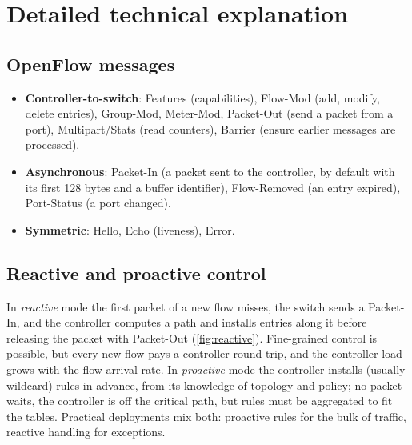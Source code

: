 \documentclass[11pt,a4paper]{article}
\begin{document}
\begin{acnfigure}
  \caption{OpenFlow pipeline with multiple flow tables, and the fields of a flow entry.}
  \label{fig:table}
\end{acnfigure}

\section{Detailed technical explanation}

\subsection{OpenFlow messages}
\begin{itemize}
  \item \textbf{Controller-to-switch}: Features (capabilities), Flow-Mod (add, modify, delete entries),
        Group-Mod, Meter-Mod, Packet-Out (send a packet from a port), Multipart/Stats (read counters), Barrier
        (ensure earlier messages are processed).
  \item \textbf{Asynchronous}: Packet-In (a packet sent to the controller, by default with its first 128 bytes
        and a buffer identifier), Flow-Removed (an entry expired), Port-Status (a port changed).
  \item \textbf{Symmetric}: Hello, Echo (liveness), Error.
\end{itemize}

\subsection{Reactive and proactive control}
In \emph{reactive} mode the first packet of a new flow misses, the switch sends a Packet-In, and the
controller computes a path and installs entries along it before releasing the packet with Packet-Out
(\cref{fig:reactive}). Fine-grained control is possible, but every new flow pays a controller round trip,
and the controller load grows with the flow arrival rate. In \emph{proactive} mode the controller installs
(usually wildcard) rules in advance, from its knowledge of topology and policy; no packet waits, the
controller is off the critical path, but rules must be aggregated to fit the tables. Practical deployments
mix both: proactive rules for the bulk of traffic, reactive handling for exceptions.

\begin{acnfigure}
  \caption{Reactive flow set-up: table miss, Packet-In, Flow-Mod along the path, Packet-Out.}
  \label{fig:reactive}
\end{acnfigure}
\end{document}
